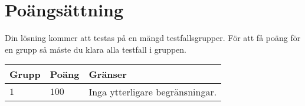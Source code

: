 \section*{Poängsättning}
Din lösning kommer att testas på en mängd testfallsgrupper.
För att få poäng för en grupp så måste du klara alla testfall i gruppen.

\noindent
\begin{tabular}{| l | l | p{12cm} |}
  \hline
  \textbf{Grupp} & \textbf{Poäng} & \textbf{Gränser} \\ \hline
  $1$    & $100$  & Inga ytterligare begränsningar. \\ \hline
\end{tabular}

